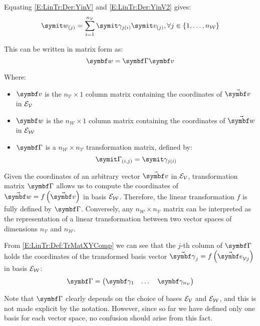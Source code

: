 Equating \eqref{E:LinTr:Der:YinV} and \eqref{E:LinTr:Der:YinV2} gives:
\begin{equation} \label{E:LinTr:Res:YComp}
\cmp{w}{j} = \sum_{i=1}^{n_{\mathcal{V}}} {\cmpsub{\gamma}{j}{i} \cmp{v}{j}}, \forall j \in \{1,\dots,n_{\mathcal{W}}\}
\end{equation}

This can be written in matrix form as:
\begin{equation} \label{E:LinTr:Res:TrMatYX}
\mcol{w}=\mat{\Gamma} \mcol{v} 
\end{equation}

Where:
\begin{itemize}
\item $\mcol{v}$ is the $n_{\mathcal{V}}\times 1$ column matrix containing the coordinates of $\vabs{v}$ in $\basis[\mathcal{V}]$
\item $\mcol{w}$ is the $n_{\mathcal{W}}\times 1$ column matrix containing the coordinates of $\vabs{w}$ in $\basis[\mathcal{W}]$
\item $\mat{\Gamma}$ is a $n_{\mathcal{W}} \times n_{\mathcal{V}}$ transformation matrix, defined by:
\begin{equation} \label{E:LinTr:Def:TrMatXYComp}
\cmp{\Gamma}{i,j}=\cmpsub{\gamma}{j}{i}
\end{equation}
\end{itemize}

Given the coordinates of an arbitrary vector $\vabs{v}$ in $\basis[\mathcal{V}]$, transformation matrix $\mat{\Gamma}$ allows us to compute the coordinates of $\vabs{w}=f\rndp{\vabs{v}}$ in basis $\basis[\mathcal{W}]$. Therefore, the linear transformation $f$ is fully defined by $\mat{\Gamma}$. Conversely, any $n_{\mathcal{W}}\times n_{\mathcal{V}}$ matrix can be interpreted as the representation of a linear transformation between two vector spaces of dimensions $n_{\mathcal{V}}$ and $n_{\mathcal{W}}$.

From \eqref{E:LinTr:Def:TrMatXYComp} we can see that the $j$-th column of $\mat{\Gamma}$ holds the coordinates of the transformed basis vector $\vasub{\gamma}{j}=f\rndp{\vasub{\bv}{\mathcal{V} j}}$ in basis $\basis[\mathcal{W}]$:
\begin{equation} \label{E:LinTr:Res:TrMatCols}
	\mat{\Gamma} =  \matenv{
		\vsub{\gamma}{1} &
		\dots &
		\vsub{\gamma}{n_{\mathcal{V}}}
		}
\end{equation}

Note that $\mat{\Gamma}$ clearly depends on the choice of bases $\basis[\mathcal{V}]$ and $\basis[\mathcal{W}]$, and this is not made explicit by the notation. However, since so far we have defined only one basis for each vector space, no confusion should arise from this fact.

